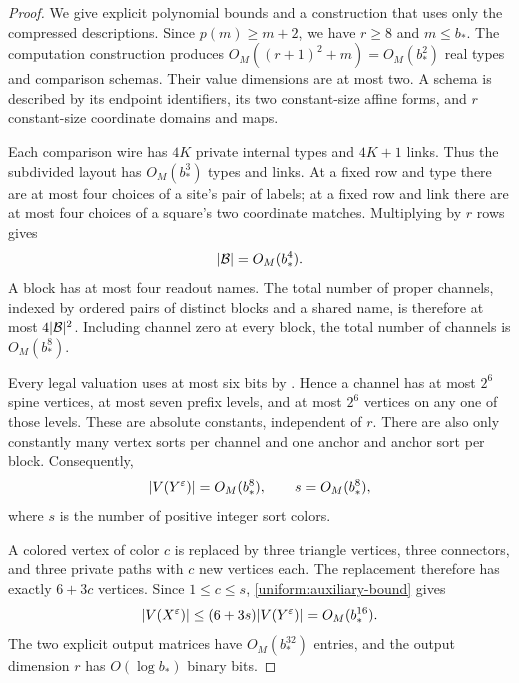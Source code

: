 \documentclass[11pt]{article}
\theoremstyle{definition}
\newcommand{\cB}{\mathcal B}
\newcommand{\eps}{\varepsilon}
\DeclarePairedDelimiter{\abs}{\lvert}{\rvert}
\begin{document}
\begin{proof}
We give explicit polynomial bounds and a construction that uses only the
compressed descriptions.  Since $p(m)\geq m+2$, we have $r\geq 8$ and
$m\leq b_*$.  The computation construction produces
$O_M((r+1)^2+m)=O_M(b_*^2)$ real types and comparison schemas.  Their
value dimensions are at most two.  A schema is described by its endpoint
identifiers, its two constant-size affine forms, and $r$ constant-size
coordinate domains and maps.

Each comparison wire has $4K$ private internal types and $4K+1$ links.
Thus the subdivided layout has $O_M(b_*^3)$ types and links.  At a fixed
row and type there are at most four choices of a site's pair of labels;
at a fixed row and link there are at most four choices of a square's two
coordinate matches.  Multiplying by $r$ rows gives
\begin{equation}
\label{uniform:block-bound}
 \abs{\cB}=O_M(b_*^4).
\end{equation}
A block has at most four readout names.  The total number of proper
channels, indexed by ordered pairs of distinct blocks and a shared name,
is therefore at most $4\abs{\cB}^2$.  Including channel zero at every
block, the total number of channels is $O_M(b_*^8)$.

Every legal valuation uses at most six bits by
.  Hence a channel has at most $2^6$ spine
vertices, at most seven prefix levels, and at most $2^6$ vertices on any
one of those levels.  These are absolute constants, independent of $r$.
There are also only constantly many vertex sorts per channel and one
anchor and anchor sort per block.  Consequently,
\begin{equation}
\label{uniform:auxiliary-bound}
 \abs{V(Y^\eps)}=O_M(b_*^8),\qquad
 s=O_M(b_*^8),
\end{equation}
where $s$ is the number of positive integer sort colors.

A colored vertex of color $c$ is replaced by three triangle vertices,
three connectors, and three private paths with $c$ new vertices each.
The replacement therefore has exactly $6+3c$ vertices.  Since
$1\leq c\leq s$, \eqref{uniform:auxiliary-bound} gives
\begin{equation}
\label{uniform:graph-bound}
 \abs{V(X^\eps)}
 \leq (6+3s)\abs{V(Y^\eps)}=O_M(b_*^{16}).
\end{equation}
The two explicit output matrices have $O_M(b_*^{32})$ entries, and the
output dimension $r$ has $O(\log b_*)$ binary bits.


\end{proof}
\end{document}
